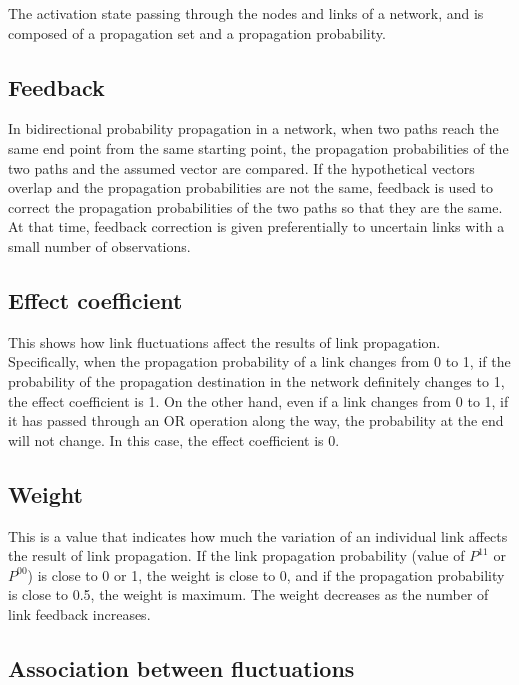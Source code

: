 \documentclass[12pt]{article}
\begin{document}
The activation state passing through the nodes and links of a network,
and is composed of a propagation set and a propagation probability.

\subsection*{Feedback}\label{glossary-feedback}

In bidirectional probability propagation in a network, when two paths
reach the same end point from the same starting point, the propagation
probabilities of the two paths and the assumed vector are compared. If
the hypothetical vectors overlap and the propagation probabilities are
not the same, feedback is used to correct the propagation probabilities
of the two paths so that they are the same. At that time, feedback
correction is given preferentially to uncertain links with a small
number of observations.

\subsection*{Effect coefficient}\label{glossary-effect-coefficient}

This shows how link fluctuations affect the results of link propagation.
Specifically, when the propagation probability of a link changes from 0
to 1, if the probability of the propagation destination in the network
definitely changes to 1, the effect coefficient is 1. On the other hand,
even if a link changes from 0 to 1, if it has passed through an OR
operation along the way, the probability at the end will not change. In
this case, the effect coefficient is 0.

\subsection*{Weight}\label{glossary-weight}

This is a value that indicates how much the variation of an individual
link affects the result of link propagation. If the link propagation
probability (value of \(P^{11}\) or \(P^{00}\)) is close to 0 or 1, the
weight is close to 0, and if the propagation probability is close to
0.5, the weight is maximum. The weight decreases as the number of link
feedback increases.

\subsection*{Association between
fluctuations}\label{glossary-association-between-fluctuations}
\end{document}
